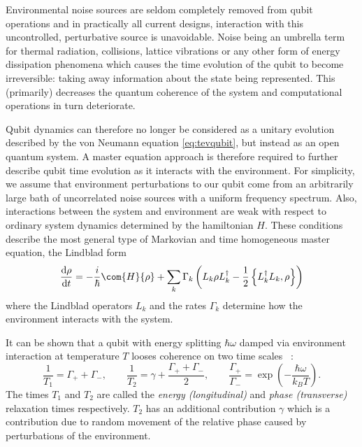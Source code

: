 Environmental noise sources are seldom completely removed from qubit operations and in practically all current designs, interaction with this uncontrolled, perturbative source is unavoidable.
Noise being an umbrella term for thermal radiation, collisions, lattice vibrations or any other form of energy dissipation phenomena which causes the time evolution of the qubit to become irreversible: taking away information about the state being represented.
This (primarily) decreases the quantum coherence of the system and computational operations in turn deteriorate.

Qubit dynamics can therefore no longer be considered as a unitary evolution described by the von Neumann equation \cref{eq:tevqubit}, but instead as an open quantum system.
A master equation approach is therefore required to further describe qubit time evolution as it interacts with the environment.
For simplicity, we assume that environment perturbations to our qubit come from an arbitrarily large bath of uncorrelated noise sources with a uniform frequency spectrum.
Also, interactions between the system and environment are weak with respect to ordinary system dynamics determined by the hamiltonian $H$.
These conditions describe the most general type of Markovian and time homogeneous master equation, the Lindblad form~\cite{Lindblad1976}
\begin{equation}
\frac{\mathrm{d}\rho}{\mathrm{d}t} =-\frac{i}{\hbar}\com{H}{\rho}+\sum_{k} \Gamma_k\left(L_k\rho L_k^\dagger-\frac{1}{2}\left\{L_k^\dagger L_k, \rho\right\}\right)
\label{eq:lindblad}
\end{equation}
where the Lindblad operators $L_k$ and the rates $\Gamma_k$ determine
how the environment interacts with the system.

It can be shown that a qubit with energy splitting $\hbar\omega$ damped via environment interaction at temperature $T$ looses coherence on two time scales ~\cite{Stenholm2005}:
\begin{equation}
\frac{1}{T_1} = \Gamma_+ + \Gamma_-, \qquad \frac{1}{T_2} = \gamma + \frac{\Gamma_+ + \Gamma_-}{2}, \qquad \frac{\Gamma_+}{\Gamma_-} = \exp\left(-\frac{\hbar \omega}{k_B T}\right).
\label{eq:t1t2}
\end{equation}
The times $T_1$ and $T_2$ are called the \textit{energy (longitudinal)} and \textit{phase (transverse)} relaxation times respectively.
$T_2$ has an additional contribution $\gamma$ which is a contribution due to random movement of the relative phase caused by perturbations of the environment.

